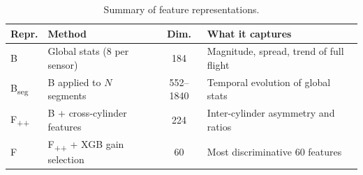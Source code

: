 \begin{table}[H]
    \centering
    \caption{Summary of feature representations.}
    \label{tab:repr_summary}
    \begin{tabular}{llcp{5.5cm}}
        \toprule
        \textbf{Repr.} & \textbf{Method} & \textbf{Dim.} & \textbf{What it captures} \\
        \midrule
        B                & Global stats (8 per sensor)  & 184     & Magnitude, spread, trend of full flight \\
        B\textsubscript{seg} & B applied to $N$ segments & 552--1840 & Temporal evolution of global stats \\
        F\textsubscript{++} & B + cross-cylinder features & 224   & Inter-cylinder asymmetry and ratios \\
        F               & F\textsubscript{++} + XGB gain selection & 60 & Most discriminative 60 features \\
        \bottomrule
    \end{tabular}
\end{table}
